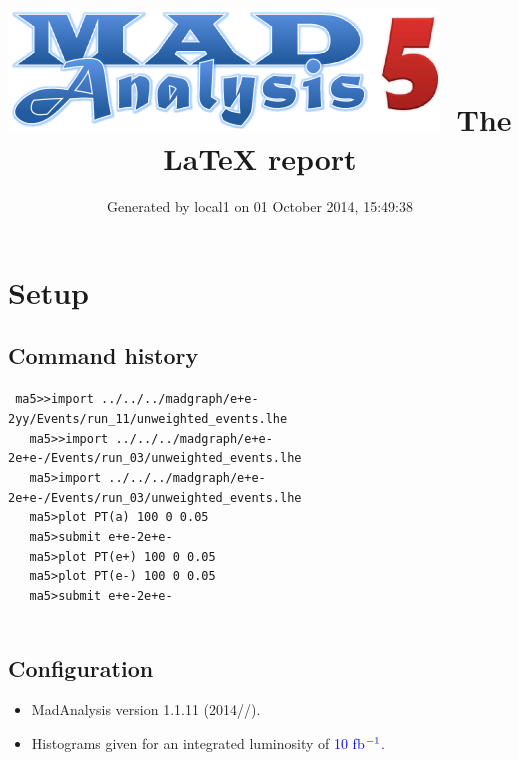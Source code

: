 \documentclass[a4paper, 11pt]{article}
\title{{\includegraphics[scale=.4]{logo.png}}\ The LaTeX report}
\author{Generated by local1 on 01 October 2014, 15:49:38}
\begin{document}
\maketitle
\flushbottom

\newpage
\section{ Setup}

\subsection{ Command history}

\texttt{ ma5>>import ../\-../\-../\-madgraph/\-e+e-2yy/\-Events/\-run\_11/\-unweighted\_events.lhe\\
}
\texttt{ }\texttt{ }\texttt{ ma5>>import ../\-../\-../\-madgraph/\-e+e-2e+e-/\-Events/\-run\_03/\-unweighted\_events.lhe\\
}
\texttt{ }\texttt{ }\texttt{ ma5>import ../\-../\-../\-madgraph/\-e+e-2e+e-/\-Events/\-run\_03/\-unweighted\_events.lhe\\
}
\texttt{ }\texttt{ }\texttt{ ma5>plot PT(a) 100 0 0.05\\
}
\texttt{ }\texttt{ }\texttt{ ma5>submit e+e-2e+e-\\
}
\texttt{ }\texttt{ }\texttt{ ma5>plot PT(e+) 100 0 0.05\\
}
\texttt{ }\texttt{ }\texttt{ ma5>plot PT(e-) 100 0 0.05\\
}
\texttt{ }\texttt{ }\texttt{ ma5>submit e+e-2e+e-\\
}
\texttt{ }\texttt{ }\subsection{ Configuration}

\begin{itemize}
  \item MadAnalysis version 1.1.11 (2014//).
   \item Histograms given for an integrated luminosity of \textcolor{blue}{10}\textcolor{blue}{ fb}$^{\textcolor{blue}{-1}}$\textcolor{blue}{.}
\textcolor{blue}{}
\end{itemize}
\newpage
\end{document}
